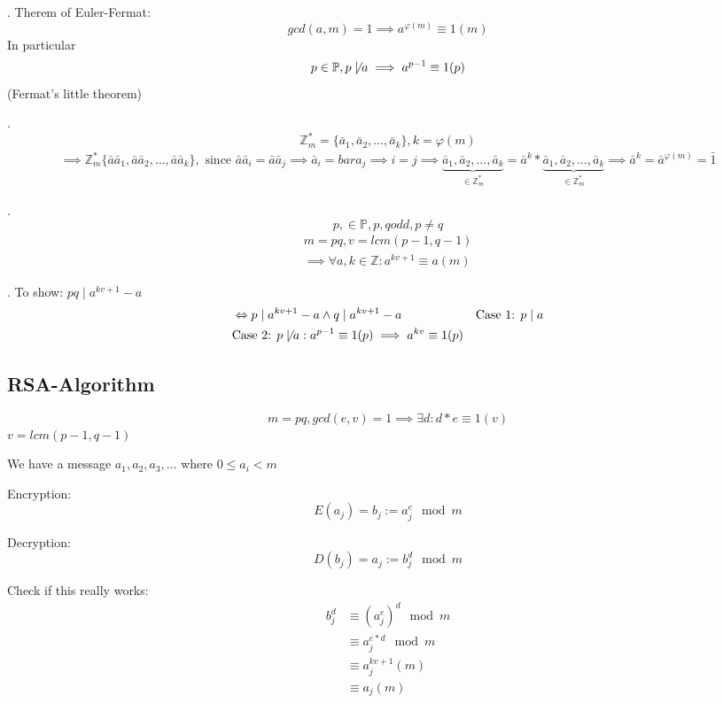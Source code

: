 \Theorem.
Therem of Euler-Fermat:
\[
  gcd(a,m) = 1 \implies a ^{\varphi(m)} \equiv 1 (m)
\]
In particular 
\[
  p \in \mathbb{P}, p \not\mid a \implies a^{p-1} \equiv 1 (p)
\]
(Fermat's little theorem)

\Proof.
\[
  \mathbb{Z}_m^{*} = \{\bar{a}_1, \bar{a}_2, \ldots, \bar{a}_k \}, k = \varphi(m)
\]
\begin{align*}
  \implies \mathbb{Z}_m^{*} \{\bar{a}\bar{a}_1, \bar{a}\bar{a}_2, \ldots, \bar{a}\bar{a}_k \}, 
    \text{ since } \bar{a}\bar{a}_i = \bar{a}\bar{a}_j 
    \implies \bar{a}_i = bar{a}_j \implies i = j
    \implies \underbrace{\bar{a}_1, \bar{a}_2, \ldots, \bar{a}_k}_
        {\in \mathbb{Z}_m^{*}}
      = \bar{a}^k * \underbrace{\bar{a}_1, \bar{a}_2, \ldots, \bar{a}_k}_
        {\in \mathbb{Z}_m^{*}}
      \implies \bar{a}^k = \bar{a}^{\varphi(m)} = \bar{1} 
\end{align*}

\Theorem.
\[
  p, \in \mathbb{P}, p,q odd, p \neq q
\]
\begin{align*}
  m= pq, v = lcm(p-1, q-1) \\
  \implies \forall a,k \in \mathbb{Z}: a ^{kv + 1} \equiv a(m)
\end{align*}

\Proof.
To show: $pq \mid a ^{kv +1} - a$
\begin{align*}
  &\Leftrightarrow p \mid a ^{kv +1} - a \land q \mid a ^{kv +1} - a
  &\text{Case 1: } p \mid a \\
  &\text{Case 2: } p\not\mid a: 
    a^{p-1} \equiv 1 (p) \implies a^{kv} \equiv 1(p)
\end{align*}

\subsection{RSA-Algorithm}
\[
  m = pq, gcd(e,v) = 1 \implies \exists d : d *e \equiv 1 (v)
\]
$v = lcm(p-1, q-1)$

We have a message $a_1, a_2, a_3, \ldots$ where $0 \leq a_i < m$

Encryption: 
\[
  E(a_j) = b_j := a_j^e \mod m
\]

Decryption: 
\[
  D(b_j) = a_j := b_j^d \mod m
\]

Check if this really works:
\begin{align*}
  b_j^d &\equiv (a_j^e)^d \mod m \\
    & \equiv a_j^{e*d} \mod m \\
    & \equiv a_j^{kv+1} (m) \\
    & \equiv a_j (m) \\
\end{align*}

